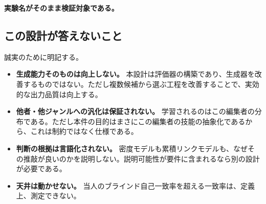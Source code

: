 \documentclass[a4paper,10.5pt]{ltjsarticle}
\begin{document}
\noindent \textbf{実験名がそのまま検証対象である。}

\subsection{この設計が答えないこと}

誠実のために明記する。

\begin{itemize}
  \item \textbf{生成能力そのものは向上しない。} 本設計は評価器の構築であり、生成器を改善するものではない。ただし複数候補から選ぶ工程を改善することで、実効的な出力品質は向上する。
  \item \textbf{他者・他ジャンルへの汎化は保証されない。} 学習されるのはこの編集者の分布である。ただし本件の目的はまさにこの編集者の技能の抽象化であるから、これは制約ではなく仕様である。
  \item \textbf{判断の根拠は言語化されない。} 密度モデルも累積リンクモデルも、なぜその推敲が良いのかを説明しない。説明可能性が要件に含まれるなら別の設計が必要である。
  \item \textbf{天井は動かせない。} 当人のブラインド自己一致率を超える一致率は、定義上、測定できない。
\end{itemize}
\end{document}
